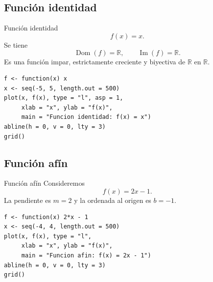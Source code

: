 \documentclass[aspectratio=169,10pt]{beamer}
\newcommand{\R}{\mathbb{R}}
\newcommand{\Dom}{\operatorname{Dom}}
\newcommand{\Ima}{\operatorname{Im}}
\begin{document}
\subsection*{Función identidad}
\begin{frame}{Función identidad}
\[
f(x)=x.
\]
Se tiene
\[
\Dom(f)=\R,\qquad \Ima(f)=\R.
\]
Es una función impar, estrictamente creciente y biyectiva de $\R$ en $\R$.

\begin{center}
\end{center}

\begin{verbatim}
f <- function(x) x
x <- seq(-5, 5, length.out = 500)
plot(x, f(x), type = "l", asp = 1,
     xlab = "x", ylab = "f(x)",
     main = "Funcion identidad: f(x) = x")
abline(h = 0, v = 0, lty = 3)
grid()
\end{verbatim}

\end{frame}
\subsection*{Función afín}
\begin{frame}{Función afín}
Consideremos
\[
f(x)=2x-1.
\]
La pendiente es $m=2$ y la ordenada al origen es $b=-1$.

\begin{center}
\end{center}

\begin{verbatim}
f <- function(x) 2*x - 1
x <- seq(-4, 4, length.out = 500)
plot(x, f(x), type = "l",
     xlab = "x", ylab = "f(x)",
     main = "Funcion afin: f(x) = 2x - 1")
abline(h = 0, v = 0, lty = 3)
grid()
\end{verbatim}

\end{frame}
\end{document}
